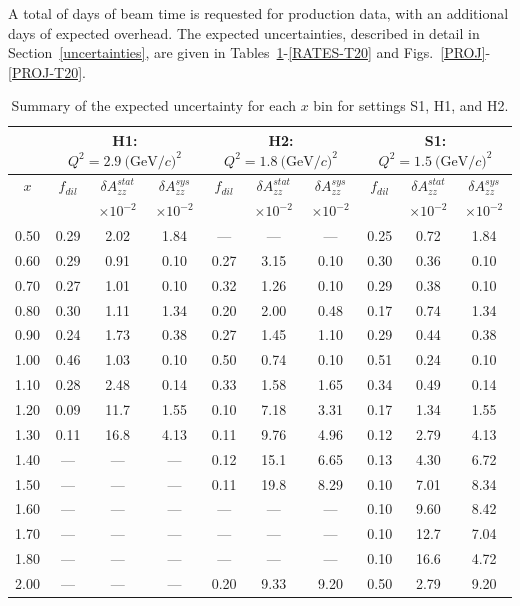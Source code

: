 A total of \productiondays days of beam time is requested for production data, with an additional \overheaddays days of expected overhead. The expected uncertainties, described in detail in Section~\ref{uncertainties}, are given in Tables~\ref{RATES2}-\ref{RATES-T20} and Figs.~\ref{PROJ}-\ref{PROJ-T20}.

\begin{table}
\begin{center}
\begin{tabular}{c|ccc|ccc|ccc}
 ~ & \multicolumn{3}{|c}{H1: $Q^2=2.9\mathrm{~(GeV/}c)^2$} & \multicolumn{3}{|c}{H2: $Q^2=1.8\mathrm{~(GeV/}c)^2$} & \multicolumn{3}{|c}{S1: $Q^2=1.5\mathrm{~(GeV/}c)^2$} \\
 \hline
  $x$  & $f_{dil}$ & $\delta A_{zz}^{stat}$ & $\delta A_{zz}^{sys}$ & $f_{dil}$ & $\delta A_{zz}^{stat}$ & $\delta A_{zz}^{sys}$ & $f_{dil}$ & $\delta A_{zz}^{stat}$ & $\delta A_{zz}^{sys}$ \\
  &     & $\times 10^{-2}$  & $\times 10^{-2}$  &    & $\times 10^{-2}$  & $\times 10^{-2}$ &    & $\times 10^{-2}$  & $\times 10^{-2}$ \\
\hline\hline
 0.50   &  0.29	 & 2.02	& 1.84	& ---	& ---	& ---	& 0.25	& 0.72	& 1.84 \\
 0.60   &  0.29	 & 0.91	& 0.10	& 0.27	& 3.15	& 0.10	& 0.30	& 0.36	& 0.10 \\ 
 0.70   &  0.27	 & 1.01	& 0.10	& 0.32	& 1.26	& 0.10	& 0.29	& 0.38	& 0.10 \\
 0.80	&  0.30	 & 1.11	& 1.34	& 0.20	& 2.00	& 0.48	& 0.17	& 0.74	& 1.34 \\
 0.90	&  0.24	 & 1.73 	& 0.38 	& 0.27	& 1.45	& 1.10	& 0.29	& 0.44	& 0.38 \\
 1.00	&  0.46	 & 1.03	& 0.10 	& 0.50	& 0.74	& 0.10	& 0.51	& 0.24	& 0.10 \\
 1.10	&  0.28	 & 2.48	& 0.14 	& 0.33	& 1.58	& 1.65	& 0.34	& 0.49	& 0.14 \\
 1.20	&  0.09	 & 11.7	& 1.55 	& 0.10	& 7.18	& 3.31	& 0.17	& 1.34	& 1.55 \\
 1.30	&  0.11	 & 16.8	& 4.13 	& 0.11	& 9.76	& 4.96	& 0.12	& 2.79	& 4.13 \\
 1.40	&  ---	 & ---	& --- 	& 0.12	& 15.1	& 6.65	& 0.13	& 4.30	& 6.72 \\
 1.50	&  ---	 & ---	& ---	& 0.11	& 19.8	& 8.29	& 0.10	& 7.01	& 8.34 \\
 1.60	&  ---	 & ---	& --- 	& ---	& ---	& ---	& 0.10	& 9.60	& 8.42 \\
 1.70	&  ---	 & ---	& --- 	& ---	& ---	& ---	& 0.10	& 12.7	& 7.04 \\
 1.80	&  ---	 & ---	& --- 	& ---	& ---	& ---	& 0.10	& 16.6	& 4.72 \\
 2.00   &  ---	 & ---	& ---	& 0.20	& 9.33	& 9.20	& 0.50	& 2.79	& 9.20 \\
\hline\hline
\end{tabular}
\caption{\label{RATES2}Summary of the expected uncertainty for each $x$ bin for settings S1, H1, and H2. }
\end{center}
\end{table}

